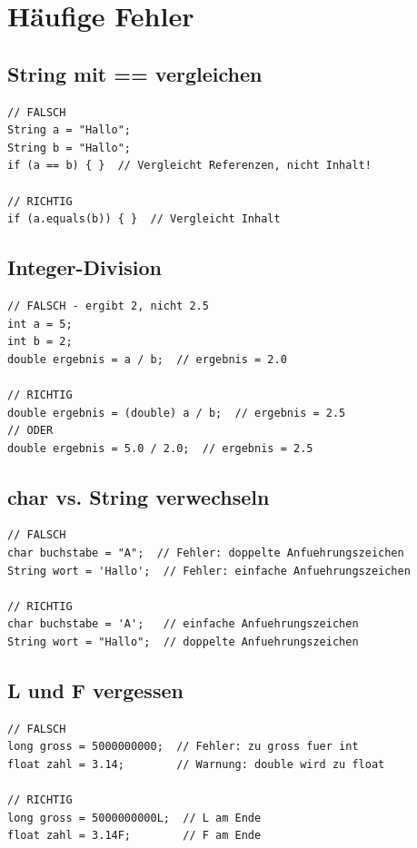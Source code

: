 \newpage


\section*{Häufige Fehler}

\subsection*{String mit == vergleichen}

\begin{lstlisting}
// FALSCH
String a = "Hallo";
String b = "Hallo";
if (a == b) { }  // Vergleicht Referenzen, nicht Inhalt!

// RICHTIG
if (a.equals(b)) { }  // Vergleicht Inhalt
\end{lstlisting}

\subsection*{Integer-Division}

\begin{lstlisting}
// FALSCH - ergibt 2, nicht 2.5
int a = 5;
int b = 2;
double ergebnis = a / b;  // ergebnis = 2.0

// RICHTIG
double ergebnis = (double) a / b;  // ergebnis = 2.5
// ODER
double ergebnis = 5.0 / 2.0;  // ergebnis = 2.5
\end{lstlisting}

\subsection*{char vs. String verwechseln}

\begin{lstlisting}
// FALSCH
char buchstabe = "A";  // Fehler: doppelte Anfuehrungszeichen
String wort = 'Hallo';  // Fehler: einfache Anfuehrungszeichen

// RICHTIG
char buchstabe = 'A';   // einfache Anfuehrungszeichen
String wort = "Hallo";  // doppelte Anfuehrungszeichen
\end{lstlisting}

\subsection*{L und F vergessen}

\begin{lstlisting}
// FALSCH
long gross = 5000000000;  // Fehler: zu gross fuer int
float zahl = 3.14;        // Warnung: double wird zu float

// RICHTIG
long gross = 5000000000L;  // L am Ende
float zahl = 3.14F;        // F am Ende
\end{lstlisting}

